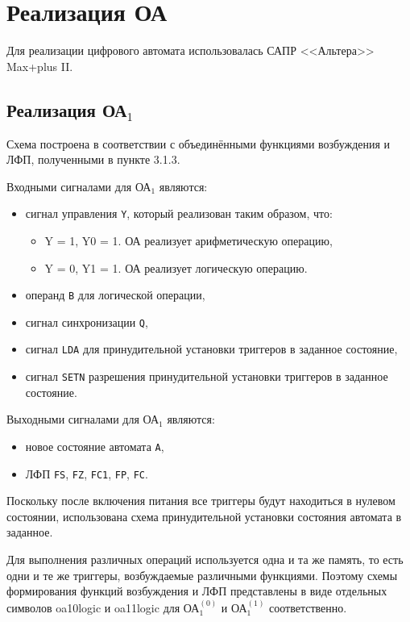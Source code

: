 
\newpage
\section{Реализация ОА}

Для реализации цифрового автомата использовалась САПР <<Альтера>> Max+plus II.

\subsection{Реализация ОА${}_1$}

Схема построена в соответствии с объединёнными функциями возбуждения и ЛФП, полученными в пункте 3.1.3.

Входными сигналами для ОА${}_1$ являются:
\begin{itemize}
	\item сигнал управления \texttt{Y}, который реализован таким образом, что:
		\begin{itemize}
			\item Y = 1, Y0 = 1. ОА реализует арифметическую операцию, 
			\item Y = 0, Y1 = 1. ОА реализует логическую операцию.
		\end{itemize}
	\item операнд \texttt{B} для логической операции,
	\item сигнал синхронизации \texttt{Q},
	\item сигнал \texttt{LDA} для принудительной установки триггеров в заданное состояние,
	\item сигнал \texttt{SETN} разрешения принудительной установки триггеров в заданное состояние.
\end{itemize}

Выходными сигналами для ОА${}_1$ являются:
\begin{itemize}
	\item новое состояние автомата \texttt{A},
	\item ЛФП \texttt{FS}, \texttt{FZ}, \texttt{FC1}, \texttt{FP}, \texttt{FC}.
\end{itemize}

Поскольку после включения питания все триггеры будут находиться в нулевом состоянии, использована схема принудительной установки состояния автомата в заданное.

Для выполнения различных операций используется одна и та же память, то есть одни и те же триггеры, возбуждаемые различными функциями. Поэтому схемы формирования функций возбуждения и ЛФП представлены в виде отдельных символов oa10\textunderscore logic и oa11\textunderscore logic для ОА$^{(0)}_{1}$ и ОА$^{(1)}_{1}$ соответственно.

